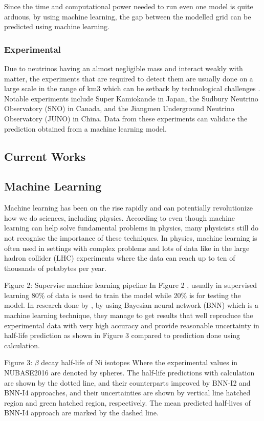 Since the time and computational power needed to run even one model is quite arduous, by using machine learning, the gap between the modelled grid can be predicted using machine learning.

\subsubsection{Experimental}
Due to neutrinos having an almost negligible mass and interact weakly with matter, the experiments that are required to detect them are usually done on a large scale in the range of km3 which can be setback by technological challenges . Notable experiments include Super Kamiokande in Japan, the Sudbury Neutrino Observatory (SNO) in Canada, and the Jiangmen Underground Neutrino Observatory (JUNO) in China. Data from these experiments can validate the prediction obtained from a machine learning model.

\subsection{Current Works}



\subsection{Machine Learning}

Machine learning has been on the rise rapidly and can potentially revolutionize how we do sciences, including physics. According to  even though machine learning can help solve fundamental problems in physics, many physicists still do not recognise the importance of these techniques. In physics, machine learning is often used in settings with complex problems and lots of data like in the large hadron collider (LHC) experiments where the data can reach up to ten of thousands of petabytes per year. 

Figure 2: Supervise machine learning pipeline
In Figure 2 , usually in supervised learning 80\% of data is used to train the model while 20\% is for testing the model.
In research done by , by using Bayesian neural network (BNN) which is a machine learning technique, they manage to get results that well reproduce the experimental data with very high accuracy and provide reasonable uncertainty in half-life prediction as shown in Figure 3 compared to prediction done using calculation.  

Figure 3: $\beta$ decay half-life of Ni isotopes
Where the experimental values in NUBASE2016 are denoted by spheres. The half-life predictions with calculation are shown by the dotted line, and their counterparts improved by BNN-I2 and BNN-I4 approaches, and their uncertainties are shown by vertical line hatched region and green hatched region, respectively. The mean predicted half-lives of BNN-I4 approach are marked by the dashed line.
